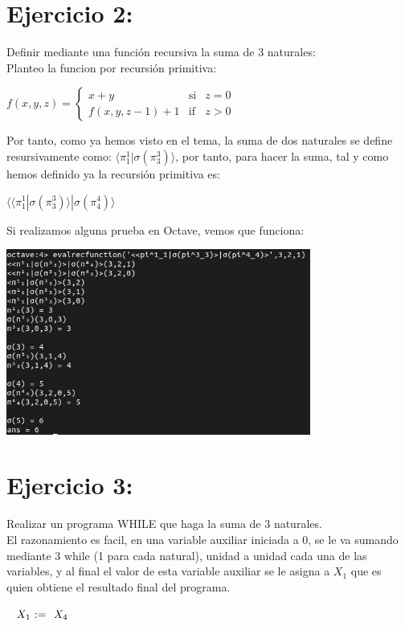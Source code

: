 \documentclass[12pt]{article}
\begin{document}
\section*{Ejercicio 2:}
Definir mediante una función recursiva la suma de 3 naturales:\\
Planteo la funcion por recursión primitiva:
\begin{center}
    $f(x,y,z)=\left\{ 
\begin{array}{lcc}
    x+y                          & \text{si} & z=0\\
    f(x,y, z-1)+1 & \text{if} & z>0 
\end{array}\right.$
\end{center}
Por tanto, como ya hemos visto en el tema, la suma de dos naturales se define resursivamente como: $\langle \pi^1_1 | \sigma(\pi^3_3) \rangle $, por tanto, para hacer la suma, tal y como hemos definido ya la recursión primitiva es:
\begin{center}
    $\langle\langle \pi^1_1 | \sigma(\pi^3_3) \rangle | \sigma(\pi^4_4) \rangle$
\end{center}
Si realizamos alguna prueba en Octave, vemos que funciona:
\begin{center}
    \includegraphics[width=10cm]{suma3.jpg}
\end{center}
\section*{Ejercicio 3:}
Realizar un programa WHILE que haga la suma de 3 naturales.\\
El razonamiento es facil, en una variable auxiliar iniciada a 0, se le va sumando mediante 3 while (1 para cada natural), unidad a unidad cada una de las variables, y al final el valor de esta variable auxiliar se le asigna a $X_1$ que es quien obtiene el resultado final del programa. 

\begin{whilecode}[H]

 $X_1 \Assig X_4$\

\end{whilecode}
\end{document}
